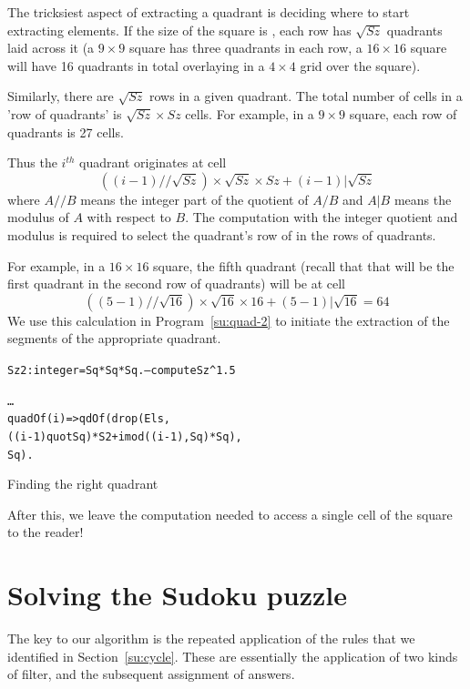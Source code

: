 The tricksiest aspect of extracting a quadrant is deciding where to start extracting elements. If the size of the square is , each row has $\sqrt{Sz}$ quadrants laid across it (a $9\times9$ square has three quadrants in each row, a $16\times16$ square will have 16 quadrants in total overlaying in a $4\times4$ grid over the square).

Similarly, there are $\sqrt{Sz}$ rows in a given quadrant. The total number of cells in a 'row of quadrants' is $\sqrt{Sz}\times{}Sz$ cells. For example, in a $9\times9$ square, each row of quadrants is 27 cells.

Thus the $i^{th}$ quadrant originates at cell
\[
((i-1)//\sqrt{Sz})\times\sqrt{Sz}\times{}Sz+(i-1)|\sqrt{Sz}
\]
where $A//B$ means the integer part of the quotient of $A/B$ and $A|B$ means the modulus of $A$ with respect to $B$. The computation with the integer quotient and modulus is required to select the quadrant's row of in the rows of quadrants.

For example, in a $16\times16$ square, the fifth quadrant (recall that that will be the first quadrant in the second row of quadrants) will be at cell 
\[
((5-1)//\sqrt{16})\times\sqrt{16}\times16+(5-1)|\sqrt{16} = 64
\]
We use this calculation in Program~\vref{su:quad-2} to initiate the extraction of the segments of the appropriate quadrant.
\begin{program}
\vspace{0.5ex}
\begin{alltt}
Sz2:integer = Sq*Sq*Sq.   -- compute Sz^1.5

\ldots{}
quadOf(i) => qdOf(drop(Els,
                     ((i-1) quot Sq)*S2+imod((i-1),Sq)*Sq),
                  Sq).
\end{alltt}
\vspace{-2ex}
\caption{Finding the right quadrant}
\label{su:quad-2}
\end{program}

\begin{aside}
After this, we leave the computation needed to access a single cell of the square to the reader!
\end{aside}

\section{Solving the Sudoku puzzle}
\label{su:solve}

The key to our algorithm is the repeated application of the rules that we identified in Section~\vref{su:cycle}. These are essentially the application of two kinds of filter, and the subsequent assignment of answers.

